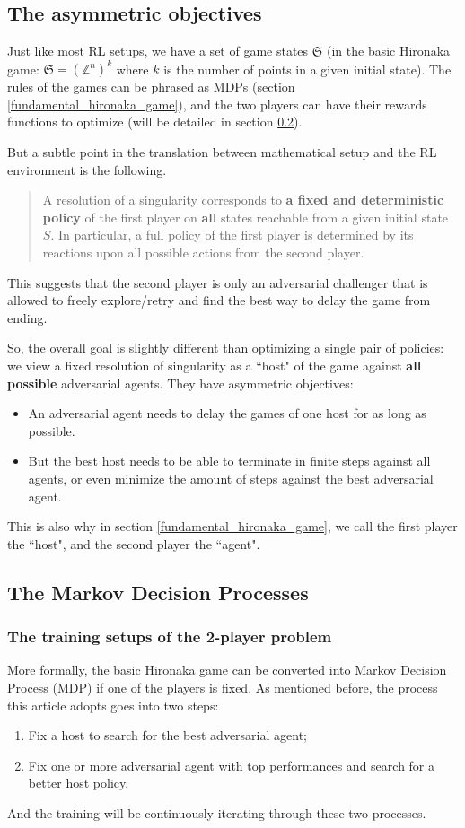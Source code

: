 \documentclass{article}
\theoremstyle{plain}
\theoremstyle{definition}
\theoremstyle{remark}
\newcommand{\ZZ}{{\mathbb{Z}}}
\begin{document}
\subsection{The asymmetric objectives}
Just like most RL setups, we have a set of game states $\mathfrak S$ (in the basic Hironaka game: $\mathfrak S = (\ZZ^n)^k$ where $k$ is the number of points in a given initial state). The rules of the games can be phrased as MDPs (section \ref{fundamental_hironaka_game}), and the two players can have their rewards functions to optimize (will be detailed in section \ref{mdp}). 

But a subtle point in the translation between mathematical setup and the RL environment is the following.
\begin{quote}
A resolution of a singularity corresponds to {\bf a fixed and deterministic policy} of the first player on {\bf all} states reachable from a given initial state $S$. In particular, a full policy of the first player is determined by its reactions upon all possible actions from the second player.
\end{quote}
This suggests that the second player is only an adversarial challenger that is allowed to freely explore/retry and find the best way to delay the game from ending.

So, the overall goal is slightly different than optimizing a single pair of policies: we view a fixed resolution of singularity as a ``host" of the game against {\bf all possible} adversarial agents. They have asymmetric objectives:
\begin{itemize}
    \item An adversarial agent needs to delay the games of one host for as long as possible.
    \item But the best host needs to be able to terminate in finite steps against all agents, or even minimize the amount of steps against the best adversarial agent.
\end{itemize}
This is also why in section \ref{fundamental_hironaka_game}, we call the first player the ``host", and the second player the ``agent". 

\subsection{The Markov Decision Processes}\label{mdp}

\subsubsection{The training setups of the 2-player problem}
More formally, the basic Hironaka game can be converted into Markov Decision
Process (MDP) if one of the players is fixed. As mentioned before, the process this article adopts goes into two steps:
\begin{enumerate}
    \item Fix a host to search for the best adversarial agent;
    \item Fix one or more adversarial agent with top performances and search for a better host policy.
\end{enumerate}
And the training will be continuously iterating through these two processes.
\end{document}
